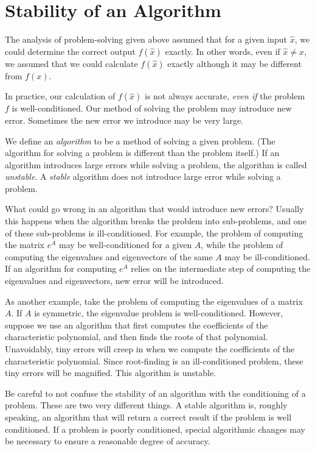 \section*{Stability of an Algorithm}

The analysis of problem-solving given above assumed that for a given input $\hat{x}$, we could determine the correct output $f(\hat{x})$ exactly. In other words, even if $\hat{x} \neq x$, we assumed that we could calculate $f(\hat{x})$ exactly although it may be different from $f(x)$. 

In practice, our calculation of $f(\hat{x})$ is not always accurate, \emph{even if} the problem $f$ is well-conditioned. Our method of solving the problem may introduce new error. Sometimes the new error we introduce may be very large. 

We define an \emph{algorithm} to be a method of solving a given problem. (The algorithm for solving a problem is different than the problem itself.) If an algorithm introduces large errors while solving a problem, the algorithm is called \emph{unstable}. A \emph{stable} algorithm does not introduce large error while solving a problem.

What could go wrong in an algorithm that would introduce new errors? Usually this happens when the algorithm breaks the problem into sub-problems, and one of these sub-problems is ill-conditioned. For example, the problem of computing the matrix $e^A$ may be well-conditioned for a given $A$, while the problem of computing the eigenvalues and eigenvectors of the same $A$ may be ill-conditioned. If an algorithm for computing $e^A$ relies on the intermediate step of computing the eigenvalues and eigenvectors, new error will be introduced. 

As another example, take the problem of computing the eigenvalues of a matrix $A$. If $A$ is symmetric, the eigenvalue problem is well-conditioned. However, suppose we use an algorithm that first computes the coefficients of the characteristic polynomial, and then finds the roots of that polynomial. Unavoidably, tiny errors will creep in when we compute the coefficients of the characteristic polynomial. Since root-finding is an ill-conditioned problem, these tiny errors will be magnified. This algorithm is unstable.

\begin{warn}
Be careful to not confuse the stability of an algorithm with the conditioning of a problem.
These are two very different things.
A stable algorithm is, roughly speaking, an algorithm that will return a correct result if the problem is well conditioned.
If a problem is poorly conditioned, special algorithmic changes may be necessary to ensure a reasonable degree of accuracy.
\end{warn}

